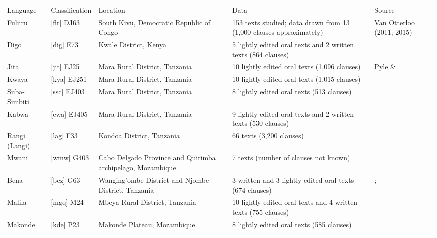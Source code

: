 \documentclass[output=paper]{langsci/langscibook}
\begin{document}
\begin{tabular}{lllll}
\lsptoprule
 Language & Classification & Location & Data & Source\\
 Fuliiru & [flr] DJ63 & South Kivu, Democratic Republic of Congo & 153 texts studied; data drawn from 13 (1,000 clauses approximately) & Van Otterloo (2011; 2015)\\
 Digo & [dig] E73 & Kwale District, Kenya & 5 lightly edited oral texts and 2 written texts (864 clauses) & \citet{Nicolle2015a}\\
 Jita & [jit] EJ25 & Mara Rural District, Tanzania & 10 lightly edited oral texts (1,096 clauses) & Pyle \& \citet{Robinson2015}\\
 Kwaya & [kya] EJ251 & Mara Rural District, Tanzania & 10 lightly edited oral texts (1,015 clauses) & \citet{Odom2015}\\
 Suba-Simbiti & [ssc] EJ403 & Mara Rural District, Tanzania & 8 lightly edited oral texts (513 clauses) & \citet{Masatu2015}\\
 Kabwa & [cwa] EJ405 & Mara Rural District, Tanzania & 9 lightly edited oral texts and 2 written texts (530 clauses) & \citet{Walker2011}\\
 Rangi (Langi) & [lag] F33 & Kondoa District, Tanzania & 66 texts (3,200 clauses) & \citet{Stegen2011}\\
 Mwani & [wmw] G403 & Cabo Delgado Province and Quirimba archipelago, Mozambique & 7 texts (number of clauses not known) & \citet{Floor2005}\\
 Bena & [bez] G63 & Wanging’ombe District and Njombe District, Tanzania & 3 written and 3 lightly edited oral texts (674 clauses) & \citet{Broomhall2011}; \citet{Eaton2015a}\\
 Malila & [mgq] M24 & Mbeya Rural District, Tanzania & 10 lightly edited oral texts and 4 written texts (755 clauses) & \citet{Eaton2015b}\\
 Makonde & [kde] P23 & Makonde Plateau, Mozambique & 8 lightly edited oral texts (585 clauses) & \citet{Leach2015}\\
\lspbottomrule
\end{tabular}
\begin{table}
\caption{Languages included in this study\footnote{Languages are classified using the ISO 639-3 language code as cited in \textit{Ethnologue} (Lewis, Simons and Fennig 2015) and Maho’s (2003) updated version of Guthrie’s (1967-71) classification of the Bantu languages.}}
\label{tab:1}
\end{table}
\end{document}
